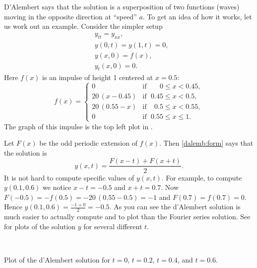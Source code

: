 \documentclass{ximera}
\begin{document}
\begin{example} \label{dalemb:implusexample}
    D'Alembert says that the solution is a superposition of two functions (waves) moving in the opposite direction at ``speed'' $a$. To get an idea of how it works, let us work out an example.  Consider the simpler setup
    \begin{align*}
        & y_{tt} = y_{xx} , \\
        & y(0,t) = y(1,t) = 0 , \\
        & y(x,0) = f(x) , \\
        & y_t(x,0) = 0 .
    \end{align*}
    Here $f(x)$ is an impulse of height 1 centered at $x=0.5$:
    \begin{equation*}
        f(x) =
        \begin{cases}
            0 & \text{if } \; \phantom{0.5}0 \leq x < 0.45, \\
            20\,(x-0.45) & \text{if } \; 0.45 \leq x < 0.5, \\
            20\,(0.55-x) & \text{if } \; \phantom{5}0.5 \leq x < 0.55, \\
            0 & \text{if } \; 0.55 \leq x \leq 1 .
        \end{cases}
    \end{equation*}
    The graph of this impulse is the top left plot in .
\end{example}

\begin{exampleSol}
    Let $F(x)$ be the odd periodic extension of $f(x)$.  Then \eqref{dalemb:form} says that the solution is
    \begin{equation*}
        y(x,t) = \frac{F(x-t) + F(x+t)}{2} .
    \end{equation*}
    It is not hard to compute specific values of $y(x,t)$.  For example, to compute $y(0.1,0.6)$ we notice $x-t = -0.5$ and $x+t = 0.7$.  Now $F(-0.5) = -f(0.5) = - 20\,(0.55 - 0.5) = -1$ and $F(0.7) = f(0.7) = 0$.  Hence $y(0.1,0.6) = \frac{-1 + 0}{2} = -0.5$.  As you can see the d'Alembert solution is much easier to actually compute and to plot than the Fourier series solution.  See  for plots of the solution $y$ for several different $t$.
    \begin{myfig}
        \capstart
         \\[5pt]
        \caption{Plot of the d'Alembert solution for $t=0$, $t=0.2$, $t=0.4$, and $t=0.6$.\label{dalemb:impulsfig}}
    \end{myfig}
\end{exampleSol}
\end{document}

